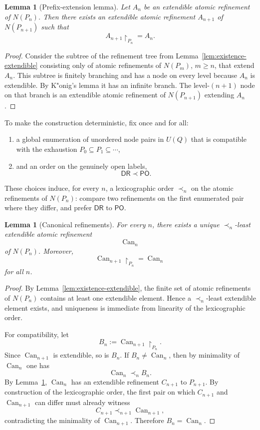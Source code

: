 \documentclass[11pt]{article}
\newtheorem{lemma}[definition]{Lemma}
\theoremstyle{remark}
\newcommand{\DR}{\mathsf{DR}}
\newcommand{\PO}{\mathsf{PO}}
\newcommand{\Can}{\operatorname{Can}}
\begin{document}
\begin{lemma}[Prefix-extension lemma]\label{lem:prefix-extension}
Let $A_n$ be an extendible atomic refinement of $N(P_n)$. Then there exists an extendible atomic refinement $A_{n+1}$ of $N(P_{n+1})$ such that
\[
A_{n+1}\!\upharpoonright_{P_n}=A_n.
\]
\end{lemma}

\begin{proof}
Consider the subtree of the refinement tree from Lemma~\ref{lem:existence-extendible} consisting only of atomic refinements of $N(P_m)$, $m\ge n$, that extend $A_n$. This subtree is finitely branching and has a node on every level because $A_n$ is extendible. By K"onig's lemma it has an infinite branch. The level-$(n+1)$ node on that branch is an extendible atomic refinement of $N(P_{n+1})$ extending $A_n$.
\end{proof}

To make the construction deterministic, fix once and for all:
\begin{enumerate}[label=(\roman*)]
    \item a global enumeration of unordered node pairs in $U(Q)$ that is compatible with the exhaustion $P_0\subseteq P_1\subseteq\cdots$,
    \item and an order on the genuinely open labels,
    \[
    \DR \prec \PO.
    \]
\end{enumerate}
These choices induce, for every $n$, a lexicographic order $\prec_n$ on the atomic refinements of $N(P_n)$: compare two refinements on the first enumerated pair where they differ, and prefer $\DR$ to $\PO$.

\begin{lemma}[Canonical refinements]\label{lem:canonical-refinements}
For every $n$, there exists a unique $\prec_n$-least extendible atomic refinement
\[
\Can_n
\]
of $N(P_n)$. Moreover,
\[
\Can_{n+1}\!\upharpoonright_{P_n}=\Can_n
\]
for all $n$.
\end{lemma}

\begin{proof}
By Lemma~\ref{lem:existence-extendible}, the finite set of atomic refinements of $N(P_n)$ contains at least one extendible element. Hence a $\prec_n$-least extendible element exists, and uniqueness is immediate from linearity of the lexicographic order.

For compatibility, let
\[
B_n:=\Can_{n+1}\!\upharpoonright_{P_n}.
\]
Since $\Can_{n+1}$ is extendible, so is $B_n$. If $B_n\neq \Can_n$, then by minimality of $\Can_n$ one has
\[
\Can_n\prec_n B_n.
\]
By Lemma~\ref{lem:prefix-extension}, $\Can_n$ has an extendible refinement $C_{n+1}$ to $P_{n+1}$. By construction of the lexicographic order, the first pair on which $C_{n+1}$ and $\Can_{n+1}$ can differ must already witness
\[
C_{n+1}\prec_{n+1}\Can_{n+1},
\]
contradicting the minimality of $\Can_{n+1}$. Therefore $B_n=\Can_n$.
\end{proof}
\end{document}

